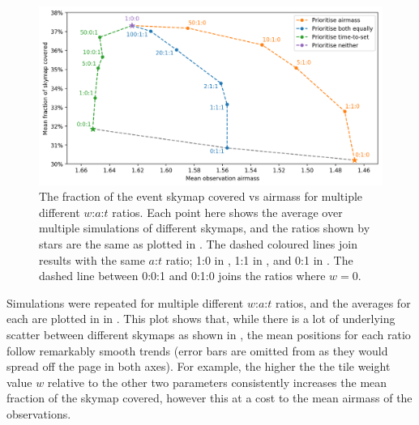 \begin{colsection}
\begin{colsection}
\begin{figure}[t]
    \begin{center}
        \includegraphics[width=\linewidth]{images/sched_sim2.png}
    \end{center}
    \caption[Scheduler simulation results for different $w$:$a$:$t$ ratios]{
        The fraction of the event skymap covered vs airmass for multiple different $w$:$a$:$t$ ratios. Each point here shows the average over multiple simulations of different skymaps, and the ratios shown by stars are the same as plotted in . The dashed coloured lines join results with the same $a$:$t$ ratio; 1:0 in , 1:1 in , and 0:1 in . The  dashed line between 0:0:1 and 0:1:0 joins the ratios where $w=0$.
    }\label{fig:scheduler_sim_results2}
\end{figure}

Simulations were repeated for multiple different $w$:$a$:$t$ ratios, and the averages for each are plotted in in . This plot shows that, while there is a lot of underlying scatter between different skymaps as shown in , the mean positions for each ratio follow remarkably smooth trends (error bars are omitted from  as they would spread off the page in both axes). For example, the higher the the tile weight value $w$ relative to the other two parameters consistently increases the mean fraction of the skymap covered, however this at a cost to the mean airmass of the observations.


\end{colsection}
\end{colsection}
